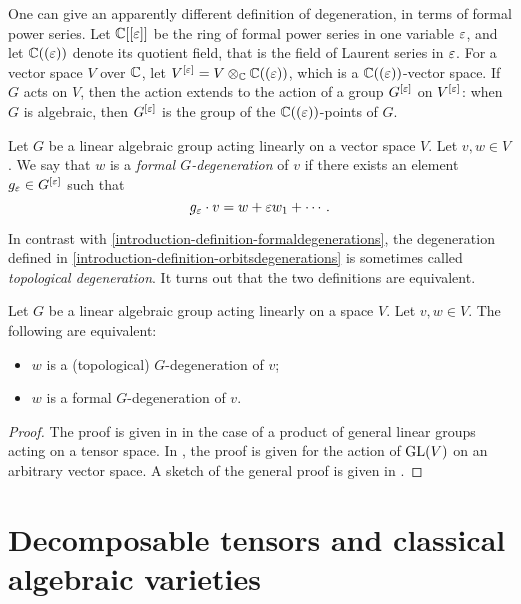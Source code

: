 One can give an apparently different definition of degeneration, in terms of formal power series. Let $\mathbb{C}[[\varepsilon]]$ be the ring of formal power series in one variable $\varepsilon$, and let $\mathbb{C}((\varepsilon))$ denote its quotient field, that is the field of Laurent series in $\varepsilon$. For a vector space $V$ over $\mathbb{C}$, let $V^{[\varepsilon]} = V \otimes_{\mathbb{C}} \mathbb{C}((\varepsilon))$, which is a $\mathbb{C}((\varepsilon))$-vector space. If $G$ acts on $V$, then the action extends to the action of a group $G^{[\varepsilon]}$ on $V^{[\varepsilon]}$: when $G$ is algebraic, then $G^{[\varepsilon]}$ is the group of the $\mathbb{C}((\varepsilon))$-points of $G$. 
\begin{definition}
\label{introduction-definition-formaldegenerations}

Let $G$ be a linear algebraic group acting linearly on a vector space $V$. Let $v,w \in V$. We say that $w$ is a \emph{formal $G$-degeneration} of $v$ if there exists an element $g_\varepsilon \in G^{[\varepsilon]}$ such that
\[
g_\varepsilon \cdot v = w + \varepsilon w_1 + \cdots .
\]
\end{definition}
In contrast with \ref{introduction-definition-formaldegenerations}, the degeneration defined in \ref{introduction-definition-orbitsdegenerations} is sometimes called \emph{topological degeneration}. It turns out that the two definitions are equivalent.
\begin{theorem}
\label{introduction-theorem-degenerationsequivalence}

Let $G$ be a linear algebraic group acting linearly on a space $V$. Let $v,w \in V$. The following are equivalent:
\begin{itemize}
 \item $w$ is a (topological) $G$-degeneration of $v$;
 \item $w$ is a formal $G$-degeneration of $v$.
\end{itemize}
\end{theorem}
\begin{proof}
The proof is given in \cite[Sec.20.6]{BCS97} in the case of a product of general linear groups acting on a tensor space. In \cite[Sec.2.3]{Kra84}, the proof is given for the action of $\mathrm{GL}(V)$ on an arbitrary vector space. A sketch of the general proof is given in \cite[Rmk.4.4]{CGZ23}.
\end{proof}

\section{Decomposable tensors and classical algebraic varieties}
\label{introduction-section-decomposable_tensors}

